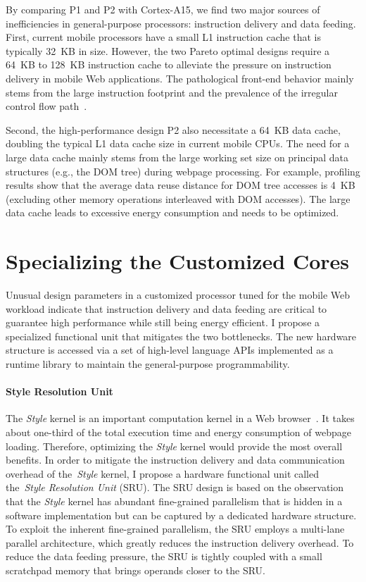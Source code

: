 By comparing P1 and P2 with Cortex-A15, we find two major sources of inefficiencies in general-purpose processors: instruction delivery and data feeding. First, current mobile processors have a small L1 instruction cache that is typically 32~KB in size. However, the two Pareto optimal designs require a 64~KB to 128~KB instruction cache to alleviate the pressure on instruction delivery in mobile Web applications. The pathological front-end behavior mainly stems from the large instruction footprint and the prevalence of the irregular control flow path~\cite{bbench}.

Second, the high-performance design P2 also necessitate a 64~KB data cache, doubling the typical L1 data cache size in current mobile CPUs. The need for a large data cache mainly stems from the large working set size on principal data structures (e.g., the DOM tree) during webpage processing. For example, profiling results show that the average data reuse distance for DOM tree accesses is 4~KB (excluding other memory operations interleaved with DOM accesses). The large data cache leads to excessive energy consumption and needs to be optimized.

\section{Specializing the Customized Cores}
\label{sec:arch:specialization}

Unusual design parameters in a customized processor tuned for the mobile Web workload indicate that instruction delivery and data feeding are critical to guarantee high performance while still being energy efficient. I propose a specialized functional unit that mitigates the two bottlenecks. The new hardware structure is accessed via a set of high-level language APIs implemented as a runtime library to maintain the general-purpose programmability.

\paragraph{Style Resolution Unit} The \textit{Style} kernel is an important computation kernel in a Web browser~\cite{webcore}. It takes about one-third of the total execution time and energy consumption of webpage loading. Therefore, optimizing the \textit{Style} kernel would provide the most overall benefits. In order to mitigate the instruction delivery and data communication overhead of the~\textit{Style} kernel, I propose a hardware functional unit called the~\textit{Style Resolution Unit} (SRU). The SRU design is based on the observation that the \textit{Style} kernel has abundant fine-grained parallelism that is hidden in a software implementation but can be captured by a dedicated hardware structure. To exploit the inherent fine-grained parallelism, the SRU employs a multi-lane parallel architecture, which greatly reduces the instruction delivery overhead. To reduce the data feeding pressure, the SRU is tightly coupled with a small scratchpad memory that brings operands closer to the SRU.

